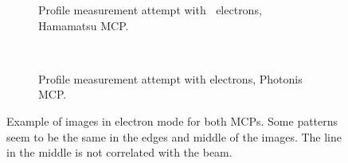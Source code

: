 \begin{figure}[!ht]
	\begin{subfigure}[t]{0.5\textwidth}
		
		\caption{Profile measurement attempt with $\ $ electrons, Hamamatsu MCP.}
		\label{}
	\end{subfigure}
	~
	\begin{subfigure}[t]{0.5\textwidth}
		
		\caption{Profile measurement attempt with electrons, Photonis MCP.}
		\label{}
	\end{subfigure}
	\caption[Example of images in electron mode]{Example of images in electron mode for both MCPs.
  Some patterns seem to be the same in the edges and middle of the images.
  The line in the middle is not correlated with the beam.}
	\label{chap4:electron_MCP}
\end{figure}
